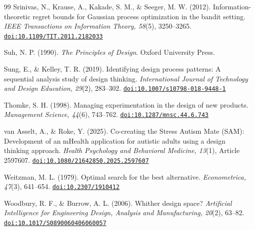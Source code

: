 \documentclass[10pt,twocolumn]{article}
\providecommand{\doi}[1]{\href{https://doi.org/#1}{\nolinkurl{doi:#1}}}
\theoremstyle{definition}
\begin{document}
\begin{thebibliography}{99}
 Srinivas, N., Krause, A., Kakade, S. M., \& Seeger, M. W. (2012). Information-theoretic regret bounds for Gaussian process optimization in the bandit setting. \textit{IEEE Transactions on Information Theory, 58}(5), 3250--3265. \doi{10.1109/TIT.2011.2182033}

 Suh, N. P. (1990). \textit{The Principles of Design}. Oxford University Press.

 Sung, E., \& Kelley, T. R. (2019). Identifying design process patterns: A sequential analysis study of design thinking. \textit{International Journal of Technology and Design Education, 29}(2), 283--302. \doi{10.1007/s10798-018-9448-1}

 Thomke, S. H. (1998). Managing experimentation in the design of new products. \textit{Management Science, 44}(6), 743--762. \doi{10.1287/mnsc.44.6.743}

 van Asselt, A., \& Roke, Y. (2025). Co-creating the Stress Autism Mate (SAM): Development of an mHealth application for autistic adults using a design thinking approach. \textit{Health Psychology and Behavioral Medicine, 13}(1), Article 2597607. \doi{10.1080/21642850.2025.2597607}

 Weitzman, M. L. (1979). Optimal search for the best alternative. \textit{Econometrica, 47}(3), 641--654. \doi{10.2307/1910412}

 Woodbury, R. F., \& Burrow, A. L. (2006). Whither design space? \textit{Artificial Intelligence for Engineering Design, Analysis and Manufacturing, 20}(2), 63--82. \doi{10.1017/S0890060406060057}

\end{thebibliography}
\end{document}
